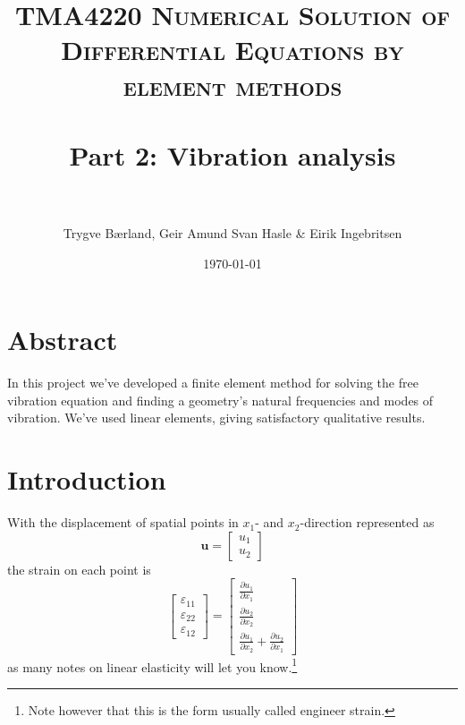 \documentclass[paper=a4, fontsize=11pt]{scrartcl} %
\title{	
\normalfont \normalsize 
\textsc{TMA4220 Numerical Solution of Differential Equations by element methods} \\ [25pt] %
\horrule{0.5pt} \\[0.4cm] %
\huge Part 2: Vibration analysis \\ %
\horrule{2pt} \\[0.5cm] %
}
\author{Trygve Bærland, Geir Amund Svan Hasle \& Eirik Ingebritsen} %
\date{\normalsize\today} %
\begin{document}
\maketitle

\section*{Abstract}
In this project we've developed a finite element method for solving the free vibration equation and finding a geometry's natural frequencies and modes of vibration. We've used linear elements, giving satisfactory qualitative results.
\section*{Introduction}
With the displacement of spatial points in $x_1$- and $x_2$-direction represented as
\begin{equation*}
\boldsymbol{u} = \begin{bmatrix}
u_1 \\ u_2
\end{bmatrix}
\end{equation*}
the strain on each point is
\begin{equation*}
\begin{bmatrix}
\varepsilon_{11} \\
\varepsilon_{22} \\
\varepsilon_{12}
\end{bmatrix}
=
\begin{bmatrix}
\frac{\partial u_1}{\partial x_1} \\
\frac{\partial u_2}{\partial x_2} \\
\frac{\partial u_1}{\partial x_2}+\frac{\partial u_2}{\partial x_1}
\end{bmatrix}
\end{equation*}
as many notes on linear elasticity will let you know.\footnote{Note however that this is the form usually called engineer strain.} 
\end{document}
